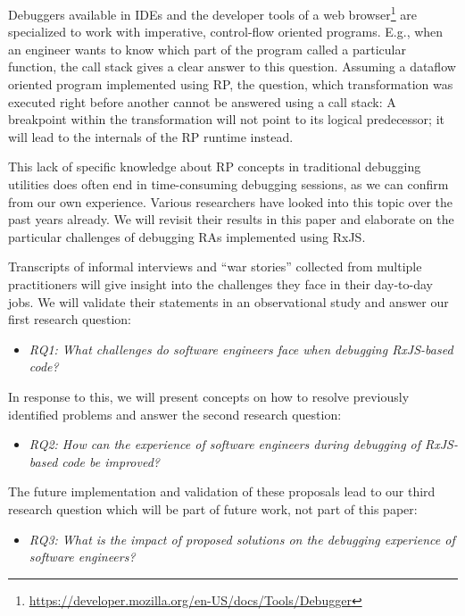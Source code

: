 \documentclass[12pt,a4paper]{article}
\begin{document}
Debuggers available in IDEs and the developer tools of a web browser\footnote{\url{https://developer.mozilla.org/en-US/docs/Tools/Debugger}} are specialized to work with imperative, control-flow oriented programs. E.g., when an engineer wants to know which part of the program called a particular function, the call stack gives a clear answer to this question. Assuming a dataflow oriented program implemented using RP, the question, which transformation was executed right before another cannot be answered using a call stack: A breakpoint within the transformation will not point to its logical predecessor; it will lead to the internals of the RP runtime instead.

This lack of specific knowledge about RP concepts in traditional debugging utilities does often end in time-consuming debugging sessions, as we can confirm from our own experience. Various researchers have looked into this topic \cite{10.1145/2577080.2577083} \cite{10.1145/2884781.2884815} \cite{10.1145/3180155.3180156} over the past years already. We will revisit their results in this paper and elaborate on the particular challenges of debugging RAs implemented using RxJS.

Transcripts of informal interviews and ``war stories'' collected from multiple practitioners will give insight into the challenges they face in their day-to-day jobs. We will validate their statements in an observational study and answer our first research question:

\begin{itemize}
	\item \emph{RQ1: What challenges do software engineers face when debugging RxJS-based code?}
\end{itemize}

In response to this, we will present concepts on how to resolve previously identified problems and answer the second research question:

\begin{itemize}
	\item \emph{RQ2: How can the experience of software engineers during debugging of RxJS-based code be improved?}
\end{itemize}

The future implementation and validation of these proposals lead to our third research question which will be part of future work, not part of this paper:

\begin{itemize}
	\item \emph{RQ3: What is the impact of proposed solutions on the debugging experience of software engineers?}
\end{itemize}
\end{document}
